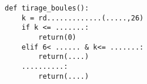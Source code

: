 \documentclass[11pt,a4paper]{book}
\begin{document}
	
\begin{minipage}{8cm} %
		
\begin{lstlisting}[style=stylepython]
def tirage_boules():
	k = rd.............(.....,26)
	if k <= .......:
		return(0)
	elif 6< ...... & k<= .......:
		return(....)
	..........:
		return(....)			
\end{lstlisting}
		
\end{minipage} %
	
\end{document}
